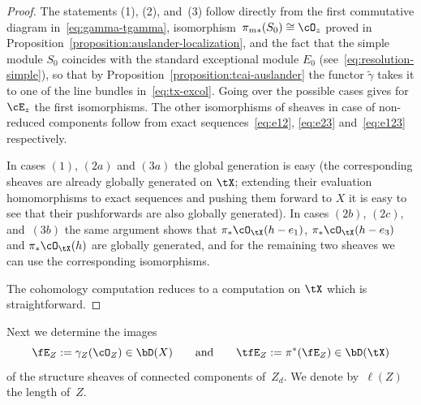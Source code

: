 \documentclass[11pt]{amsart}
\theoremstyle{plain}
\theoremstyle{definition}
\theoremstyle{remark}
\begin{document}
\begin{proof}
The statements (1), (2), and~(3) follow
directly from the first commutative diagram in~\eqref{eq:gamma-tgamma},
isomorphism~$\pi_{m*}(S_0) \cong \cO_z$ proved in Proposition~\ref{proposition:auslander-localization}, 
and the fact that the simple module $S_0$ coincides with the standard exceptional module $E_0$ (see~\eqref{eq:resolution-simple}), so that by Proposition~\ref{proposition:tcai-auslander}
the functor $\tilde\gamma$ takes it to one of the line bundles in~\eqref{eq:tx-excol}.
Going over the possible cases gives for~$\cE_z$ the first isomorphisms.
The other isomorphisms of sheaves in case of non-reduced components follow from exact sequences~\eqref{eq:e12}, \eqref{eq:e23} and~\eqref{eq:e123} respectively.

In cases $(1)$, $(2a)$ and $(3a)$ the global generation is easy (the corresponding sheaves are already globally generated on $\tX$; 
extending their evaluation homomorphisms to exact sequences and pushing them forward to $X$ it is easy to see that their pushforwards are also globally generated).
In cases $(2b)$, $(2c)$, and~$(3b)$ the same argument shows that $\pi_*\cO_\tX(h-e_1)$, $\pi_*\cO_\tX(h-e_3)$ and $\pi_*\cO_\tX(h)$ are globally generated, 
and for the remaining two sheaves we can use the corresponding isomorphisms.

The cohomology computation reduces to a computation on $\tX$ which is straightforward.
\end{proof}

Next we determine the images 
\begin{equation}
\label{def:fez}
\fE_Z := \gamma_Z(\cO_Z) \in \bD(X)
\qquad\text{and}\qquad 
\tfE_Z := \pi^*(\fE_Z) \in \bD(\tX)
\end{equation}
of the structure sheaves of connected components of~$Z_d$.
We denote by~$\ell(Z)$ the length of~$Z$.
\end{document}
